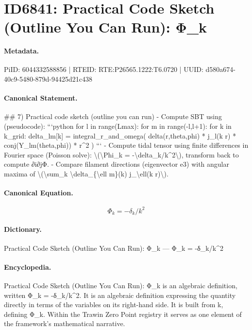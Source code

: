 \section*{ID6841: Practical Code Sketch (Outline You Can Run): Φ\_k}
\paragraph{Metadata.}
PiID: 6044332588856 | RTEID: RTE:P26565.1222:T6.0720 | UUID: d580a674-40c9-5480-879d-94425d21c438

\paragraph{Canonical Statement.}
\#\# 7) Practical code sketch (outline you can run) - Compute SBT using (pseudocode): ```python for l in range(Lmax): for m in range(-l,l+1): for k in k\_grid: delta\_lm[k] = integral\_r\_and\_omega( delta(r,theta,phi) * j\_l(k r) * conj(Y\_lm(theta,phi)) * r\textasciicircum{}2 ) ``` - Compute tidal tensor using finite differences in Fourier space (Poisson solve): \textbackslash{}(\textbackslash{}Phi\_k = -\textbackslash{}delta\_k/k\textasciicircum{}2\textbackslash{}), transform back to compute ∂i∂jΦ. - Compare filament directions (eigenvector e3) with angular maxima of \textbackslash{}(\textbackslash{}sum\_k \textbackslash{}delta\_\{\textbackslash{}ell m\}(k) j\_\textbackslash{}ell(k r)\textbackslash{}).

\paragraph{Canonical Equation.}
\[
\Phi_k = -\delta_k/k^2
\]

\paragraph{Dictionary.}
Practical Code Sketch (Outline You Can Run): Φ\_k — Φ\_k = -δ\_k/k\textasciicircum{}2

\paragraph{Encyclopedia.}
Practical Code Sketch (Outline You Can Run): Φ\_k is an algebraic definition, written Φ\_k = -δ\_k/k\textasciicircum{}2. It is an algebraic definition expressing the quantity directly in terms of the variables on its right-hand side. It is built from k, defining Φ\_k. Within the Trawin Zero Point registry it serves as one element of the framework's mathematical narrative.
